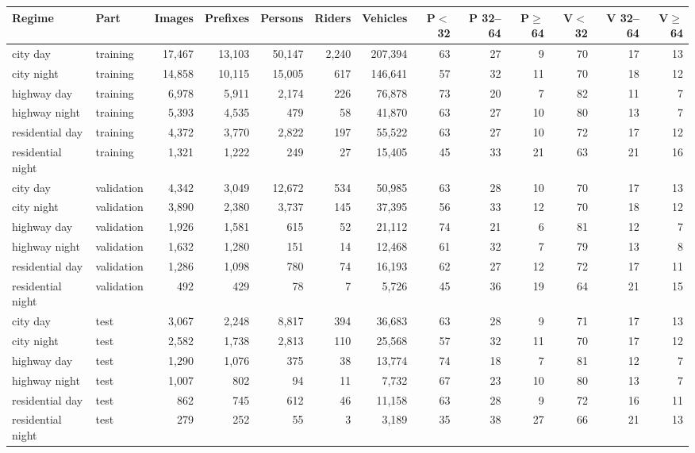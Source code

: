 \begin{tabular}{llrrrrrrrrrrr}
\toprule
Regime & Part & Images & Prefixes & Persons & Riders & Vehicles & P$<$32 & P 32--64 & P$\geq$64 & V$<$32 & V 32--64 & V$\geq$64 \\
\midrule
city day & training & 17,467 & 13,103 & 50,147 & 2,240 & 207,394 & 63 & 27 & 9 & 70 & 17 & 13 \\
city night & training & 14,858 & 10,115 & 15,005 & 617 & 146,641 & 57 & 32 & 11 & 70 & 18 & 12 \\
highway day & training & 6,978 & 5,911 & 2,174 & 226 & 76,878 & 73 & 20 & 7 & 82 & 11 & 7 \\
highway night & training & 5,393 & 4,535 & 479 & 58 & 41,870 & 63 & 27 & 10 & 80 & 13 & 7 \\
residential day & training & 4,372 & 3,770 & 2,822 & 197 & 55,522 & 63 & 27 & 10 & 72 & 17 & 12 \\
residential night & training & 1,321 & 1,222 & 249 & 27 & 15,405 & 45 & 33 & 21 & 63 & 21 & 16 \\
city day & validation & 4,342 & 3,049 & 12,672 & 534 & 50,985 & 63 & 28 & 10 & 70 & 17 & 13 \\
city night & validation & 3,890 & 2,380 & 3,737 & 145 & 37,395 & 56 & 33 & 12 & 70 & 18 & 12 \\
highway day & validation & 1,926 & 1,581 & 615 & 52 & 21,112 & 74 & 21 & 6 & 81 & 12 & 7 \\
highway night & validation & 1,632 & 1,280 & 151 & 14 & 12,468 & 61 & 32 & 7 & 79 & 13 & 8 \\
residential day & validation & 1,286 & 1,098 & 780 & 74 & 16,193 & 62 & 27 & 12 & 72 & 17 & 11 \\
residential night & validation & 492 & 429 & 78 & 7 & 5,726 & 45 & 36 & 19 & 64 & 21 & 15 \\
city day & test & 3,067 & 2,248 & 8,817 & 394 & 36,683 & 63 & 28 & 9 & 71 & 17 & 13 \\
city night & test & 2,582 & 1,738 & 2,813 & 110 & 25,568 & 57 & 32 & 11 & 70 & 17 & 12 \\
highway day & test & 1,290 & 1,076 & 375 & 38 & 13,774 & 74 & 18 & 7 & 81 & 12 & 7 \\
highway night & test & 1,007 & 802 & 94 & 11 & 7,732 & 67 & 23 & 10 & 80 & 13 & 7 \\
residential day & test & 862 & 745 & 612 & 46 & 11,158 & 63 & 28 & 9 & 72 & 16 & 11 \\
residential night & test & 279 & 252 & 55 & 3 & 3,189 & 35 & 38 & 27 & 66 & 21 & 13 \\
\bottomrule
\end{tabular}
